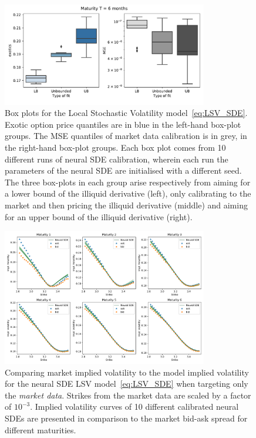  \begin{figure}[htbp]
    \centering
    \includegraphics[clip,width=0.8\textwidth]{content/reschap1/Figures/figures_SPX/lookback_bounds_mse.pdf} 
  \caption{Box plots for the Local Stochastic Volatility model~\eqref{eq:LSV_SDE}. Exotic option price quantiles are in blue in the left-hand box-plot groups. The MSE quantiles of market data calibration is in grey, in the right-hand box-plot groups. Each box plot comes from 10 different runs of neural SDE calibration, wherein each run the parameters of the neural SDE are initialised with a different seed. The three box-plots in each group arise respectively from aiming for a lower bound of the illiquid derivative (left), only calibrating to the market and then pricing the illiquid derivative (middle) and aiming for an upper bound of the illiquid derivative (right).}\label{fig:SPX LSV boxplots}
\end{figure}

\begin{figure}[htbp]
  \centering 
	\includegraphics[clip, width=0.8\textwidth]{content/reschap1/Figures/figures_SPX/iv_nsde_unbounded.pdf}
  \caption{Comparing market implied volatility to the model implied volatility for the neural SDE LSV model~\eqref{eq:LSV_SDE} when targeting only the {\em market data}. Strikes from the market data are scaled by a factor of $10^{-3}$. Implied volatility curves of 10 different calibrated neural SDEs are presented in comparison to the market bid-ask spread for different maturities.
}
\label{fig:SPX LSV calibration iv}  
\end{figure}


